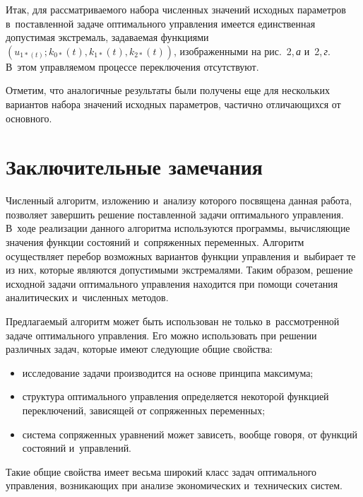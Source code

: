 \begin{multicols}{2}
Итак, для рассматриваемого набора численных значений исходных параметров 
в~поставленной задаче оптимального управления имеется единственная допустимая 
экстремаль, задаваемая функциями $(u_{1*(t)};k_{0*}(t),k_{1*}(t),k_{2*}(t))$, 
изображенными на рис.~2,\,\textit{а} и~2,\,\textit{г}. В~этом управляемом процессе переключения отсутствуют.

Отметим, что аналогичные результаты были получены еще для нескольких вариантов набора 
значений исходных параметров, частично отлича\-ющих\-ся от основного.

\vspace*{-6pt}

\section{Заключительные замечания}

Численный алгоритм, изложению и~анализу которого посвящена данная работа, 
позволяет завершить решение поставленной задачи оптимального управления. 
В~ходе реализации данного алгоритма используются программы, вычисляющие значения 
функции состояний и~сопряженных переменных. Алгоритм осуществляет перебор возможных 
вариантов функции управления и~выбирает те из них, которые являются допустимыми 
экстремалями. Таким образом, решение исходной задачи оптимального управления находится 
при помощи сочетания аналитических и~численных методов.

Предлагаемый алгоритм может быть использован не только в~рассмотренной задаче 
оптимального управления. Его можно использовать при решении различных задач, 
которые имеют следующие общие свойства:
\begin{itemize}
\item исследование задачи производится на основе принципа максимума;
\item структура оптимального управления определяется некоторой функцией переключений, 
зависящей от сопряженных переменных;
\item система сопряженных уравнений может зависеть, вообще говоря, от функций состояний и~управлений.
\end{itemize}

Такие общие свойства имеет весьма широкий класс задач оптимального управления, 
возникающих при анализе экономических и~технических систем.


\vspace*{-6pt}

{\small\frenchspacing
 {%
 \begin{thebibliography}{99}


\end{thebibliography}}}
\end{multicols}
